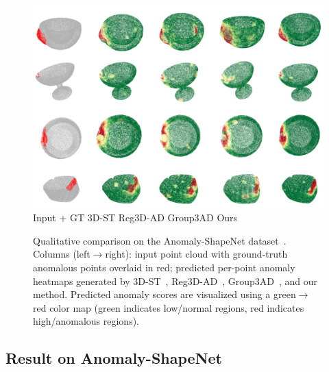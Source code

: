 \begin{figure}[!ht]
    \includegraphics[width=\linewidth]{figs/shapenet}  
    Input + GT \hspace{1.2cm} 3D-ST \cite{bergmann2023anomaly} \hspace{1.3cm} Reg3D-AD \cite{liu2023real3d} \hspace{1.5cm} Group3AD   \cite{zhu2024towards} \hspace{1.7cm} Ours \hspace{0.8cm}
    \caption{Qualitative comparison on the Anomaly-ShapeNet dataset~\cite{li2024towards}. Columns (left$\rightarrow$right): input point cloud with ground-truth anomalous points overlaid in red; predicted per-point anomaly heatmaps generated by 3D-ST~\cite{bergmann2023anomaly}, Reg3D-AD~\cite{liu2023real3d}, Group3AD~\cite{zhu2024towards}, and our method. Predicted anomaly scores are visualized using a green$\rightarrow$red color map (green indicates low/normal regions, red indicates high/anomalous regions).}
    \label{fig:shapenet}
\end{figure}

\subsection{Result on Anomaly-ShapeNet}


